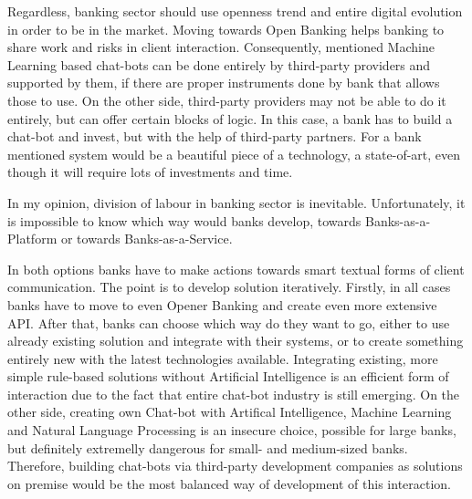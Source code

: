 Regardless, banking sector should use openness trend and entire digital evolution in order to be in the market.
Moving towards Open Banking helps banking to share work and risks in client interaction.
Consequently, mentioned Machine Learning based chat-bots can be done entirely by third-party providers and supported by them, if there are proper instruments done by bank that allows those to use.
On the other side, third-party providers may not be able to do it entirely, but can offer certain blocks of logic.
In this case, a bank has to build a chat-bot and invest, but with the help of third-party partners.
For a bank mentioned system would be a beautiful piece of a technology, a state-of-art, even though it will require lots of investments and time.

In my opinion, division of labour in banking sector is inevitable.
Unfortunately, it is impossible to know which way would banks develop, towards Banks-as-a-Platform or towards Banks-as-a-Service.

In both options banks have to make actions towards smart textual forms of client communication.
The point is to develop solution iteratively.
Firstly, in all cases banks have to move to even Opener Banking and create even more extensive API.
After that, banks can choose which way do they want to go, either to use already existing solution and integrate with their systems, or to create something entirely new with the latest technologies available.
Integrating existing, more simple rule-based solutions without Artificial Intelligence is an efficient form of interaction due to the fact that entire chat-bot industry is still emerging.
On the other side, creating own Chat-bot with Artifical Intelligence, Machine Learning and Natural Language Processing is an insecure choice, possible for large banks, but definitely extremelly dangerous for small- and medium-sized banks.
Therefore, building chat-bots via third-party development companies as solutions on premise would be the most balanced way of development of this interaction.
